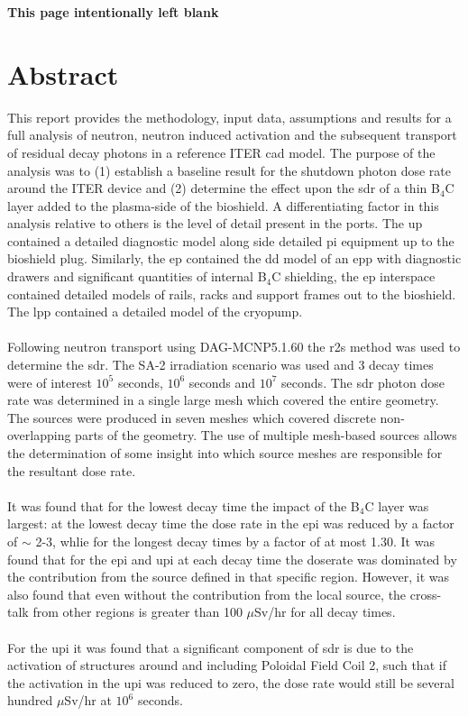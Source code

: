 \documentclass[12pt]{article}
\newcommand*{\blankpage}{%
\vspace*{\fill}
\begin{center}
 \centering \textbf{This page intentionally left blank}
\end{center}
\vspace{\fill}}
\begin{document}



\newpage
\blankpage

\newpage
\section*{Abstract}
This report provides the methodology, input data, assumptions and results for a
full analysis of neutron, neutron induced activation and the subsequent
transport of residual decay photons in a reference ITER \gls{cad} model. The 
purpose of the analysis was to (1) establish a baseline result for the shutdown 
photon dose rate around the ITER device and (2) determine the effect upon the 
\gls{sdr} of a thin B$_4$C layer added to the plasma-side of the bioshield. A 
differentiating factor in this analysis relative to others is the level of 
detail present in the ports. The \gls{up} contained a detailed diagnostic model 
along side detailed \gls{pi} equipment up to the bioshield plug. Similarly, the 
\gls{ep} contained the \gls{dd} model of an \gls{epp} with diagnostic drawers 
and significant quantities of internal B$_4$C shielding, the \gls{ep} interspace
contained detailed models of rails, racks and support frames out to the 
bioshield. The \gls{lpp} contained a detailed model of the cryopump. 
\\
\\
Following neutron transport using DAG-MCNP5.1.60 the \gls{r2s} method was used 
to  determine the \gls{sdr}. The SA-2 irradiation scenario \cite{sa2_irradiation} was used and 3 decay
times were of interest $10^5$ seconds, $10^6$ seconds and 
$10^7$ seconds. The \gls{sdr} photon dose rate was determined in a 
single large mesh which covered the entire geometry. The sources were produced 
in seven meshes which covered discrete non-overlapping parts of the geometry. 
The use of multiple mesh-based sources allows the determination of some insight 
into which source meshes are responsible for the resultant dose rate.
\\
\\
It was found that for the lowest decay time the impact of the B$_4$C layer was 
largest: at the lowest decay time the dose rate in the \gls{epi} was reduced
by a factor of $\sim$ 2-3, whlie for the longest decay times by a factor of at 
most 1.30. It was found that for the \gls{epi} and \gls{upi} at each decay time 
the doserate was dominated by the contribution from the source defined in that
specific region. However, it was also found that even without the contribution from
the local source, the cross-talk from other regions is greater than 100 
$\mu$Sv/hr for all decay times.
\\
\\
For the \gls{upi} it was found that a significant component of \gls{sdr} is due
to the activation of structures around and including  Poloidal Field Coil 2, such 
that if the activation in the \gls{upi} was reduced to zero, the dose rate would
still be several hundred $\mu$Sv/hr at $10^6$ seconds.
\end{document}
